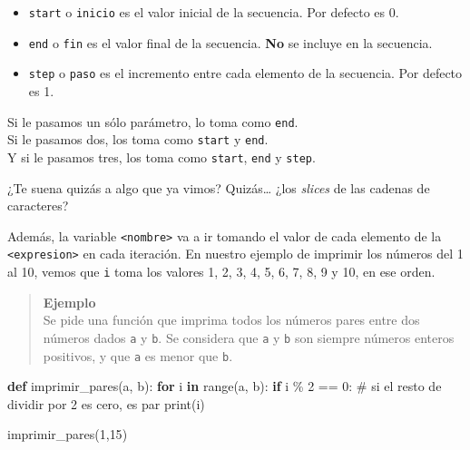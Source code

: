 \documentclass[
  letterpaper,
  DIV=11,
  numbers=noendperiod]{scrreprt}
\newenvironment{Shaded}{\begin{snugshade}}{\end{snugshade}}
\newcommand{\BuiltInTok}[1]{\textcolor[rgb]{0.00,0.23,0.31}{#1}}
\newcommand{\CommentTok}[1]{\textcolor[rgb]{0.37,0.37,0.37}{#1}}
\newcommand{\ControlFlowTok}[1]{\textcolor[rgb]{0.00,0.23,0.31}{\textbf{#1}}}
\newcommand{\DecValTok}[1]{\textcolor[rgb]{0.68,0.00,0.00}{#1}}
\newcommand{\KeywordTok}[1]{\textcolor[rgb]{0.00,0.23,0.31}{\textbf{#1}}}
\newcommand{\NormalTok}[1]{\textcolor[rgb]{0.00,0.23,0.31}{#1}}
\newcommand{\OperatorTok}[1]{\textcolor[rgb]{0.37,0.37,0.37}{#1}}
\providecommand{\tightlist}{%
  \setlength{\itemsep}{0pt}\setlength{\parskip}{0pt}}\usepackage{longtable,booktabs,array}
\begin{document}
\begin{itemize}
\tightlist
\item
  \texttt{start} o \texttt{inicio} es el valor inicial de la secuencia.
  Por defecto es 0.
\item
  \texttt{end} o \texttt{fin} es el valor final de la secuencia.
  \textbf{No} se incluye en la secuencia.
\item
  \texttt{step} o \texttt{paso} es el incremento entre cada elemento de
  la secuencia. Por defecto es 1.
\end{itemize}

Si le pasamos un sólo parámetro, lo toma como \texttt{end}.\\
Si le pasamos dos, los toma como \texttt{start} y \texttt{end}.\\
Y si le pasamos tres, los toma como \texttt{start}, \texttt{end} y
\texttt{step}.

\begin{tcolorbox}[enhanced jigsaw, opacitybacktitle=0.6, toptitle=1mm, toprule=.15mm, arc=.35mm, breakable, bottomrule=.15mm, opacityback=0, leftrule=.75mm, rightrule=.15mm, title=\textcolor{quarto-callout-note-color}{\faInfo}\hspace{0.5em}{Note}, left=2mm, bottomtitle=1mm, colframe=quarto-callout-note-color-frame, colback=white, titlerule=0mm, coltitle=black, colbacktitle=quarto-callout-note-color!10!white]

¿Te suena quizás a algo que ya vimos? Quizás\ldots{} ¿los \emph{slices}
de las cadenas de caracteres?

\end{tcolorbox}

Además, la variable \texttt{\textless{}nombre\textgreater{}} va a ir
tomando el valor de cada elemento de la
\texttt{\textless{}expresion\textgreater{}} en cada iteración. En
nuestro ejemplo de imprimir los números del 1 al 10, vemos que
\texttt{i} toma los valores 1, 2, 3, 4, 5, 6, 7, 8, 9 y 10, en ese
orden.\\

\begin{quote}
\textbf{Ejemplo}\\
Se pide una función que imprima todos los números pares entre dos
números dados \texttt{a} y \texttt{b}. Se considera que \texttt{a} y
\texttt{b} son siempre números enteros positivos, y que \texttt{a} es
menor que \texttt{b}.
\end{quote}

\begin{Shaded}
\begin{Highlighting}[]
\KeywordTok{def}\NormalTok{ imprimir\_pares(a, b):}
  \ControlFlowTok{for}\NormalTok{ i }\KeywordTok{in} \BuiltInTok{range}\NormalTok{(a, b):}
    \ControlFlowTok{if}\NormalTok{ i }\OperatorTok{\%} \DecValTok{2} \OperatorTok{==} \DecValTok{0}\NormalTok{: }\CommentTok{\# si el resto de dividir por 2 es cero, es par}
      \BuiltInTok{print}\NormalTok{(i)}

\NormalTok{imprimir\_pares(}\DecValTok{1}\NormalTok{,}\DecValTok{15}\NormalTok{)}
\end{Highlighting}
\end{Shaded}
\end{document}
